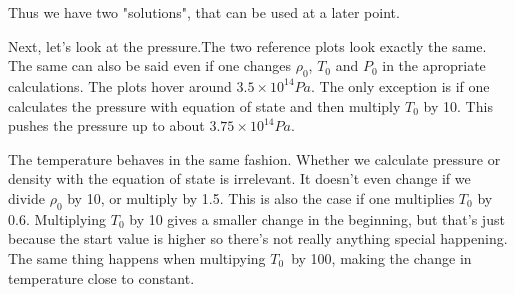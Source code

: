 \documentclass[a4paper,12pt]{article}
\begin{document}
 

Thus we have two "solutions", that can be used at a later point.

Next, let's look at the pressure.The two reference plots look exactly the same. 
The same can also be said even if one changes $\rho_0$, $T_0$ and $P_0$ in the apropriate calculations. 
The plots hover around $3.5\times10^14 Pa$. 
The only exception is if one calculates the pressure with equation of state and then multiply $T_0$ by 10. 
This pushes the pressure up to about $3.75\times10^14 Pa$.

The temperature behaves in the same fashion. Whether we calculate pressure or density with the equation of state is irrelevant. It doesn't even change if we divide $\rho_0$ by 10, or multiply by 1.5. This is also the case if one multiplies $T_0$ by 0.6. Multiplying $T_0$ by 10 gives a smaller change in the beginning, but that's just because the start value is higher so there's not really anything special happening. The same thing happens when multipying $T_0$ by 100, making the change in temperature close to constant.
\end{document}
